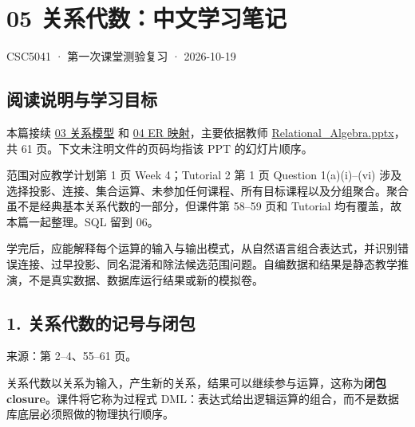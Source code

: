 \clearpage
\section{05 关系代数：中文学习笔记}\label{05_relational_algebra_zh}

CSC5041 · 第一次课堂测验复习 · 2026-10-19

\subsection{阅读说明与学习目标}\label{05_relational_algebra_zh-ux9605ux8bfbux8bf4ux660eux4e0eux5b66ux4e60ux76eeux6807}

本篇接续 \hyperref[03_relational_model_and_integrity_zh]{03 关系模型} 和 \hyperref[04_er_to_relational_mapping_zh]{04 ER 映射}，主要依据教师 \href{../../../slides/Relational_Algebra.pptx}{Relational\_Algebra.pptx}，共 61 页。下文未注明文件的页码均指该 PPT 的幻灯片顺序。

范围对应教学计划第 1 页 Week 4；Tutorial 2 第 1 页 Question 1(a)(i)--(vi) 涉及选择投影、连接、集合运算、未参加任何课程、所有目标课程以及分组聚合。聚合虽不是经典基本关系代数的一部分，但课件第 58--59 页和 Tutorial 均有覆盖，故本篇一起整理。SQL 留到 06。

学完后，应能解释每个运算的输入与输出模式，从自然语言组合表达式，并识别错误连接、过早投影、同名混淆和除法候选范围问题。自编数据和结果是静态教学推演，不是真实数据、数据库运行结果或新的模拟卷。

\subsection{1. 关系代数的记号与闭包}\label{05_relational_algebra_zh-ux5173ux7cfbux4ee3ux6570ux7684ux8bb0ux53f7ux4e0eux95edux5305}

来源：第 2--4、55--61 页。

关系代数以关系为输入，产生新的关系，结果可以继续参与运算，这称为\textbf{闭包 closure}。课件将它称为过程式 DML：表达式给出逻辑运算的组合，而不是数据库底层必须照做的物理执行顺序。

